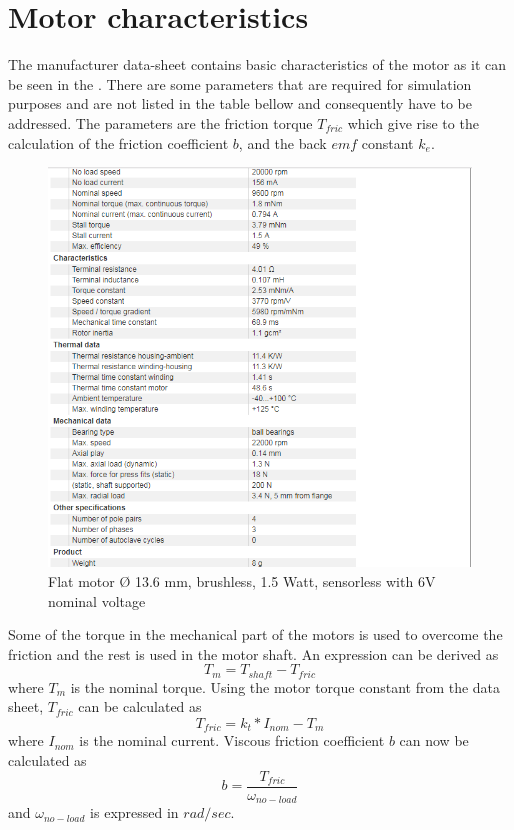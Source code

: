 \chapter{Motor characteristics}\label{chap: motorDatasheet}
%
The manufacturer data-sheet contains basic characteristics of the motor as it can be seen in the . There are some parameters that are required for simulation purposes and are not listed in the table bellow and consequently have to be addressed. The parameters are the friction torque $T_{fric}$ which give rise to the calculation of the friction coefficient $b$, and the back $emf$ constant $k_{e}$.     
%
\begin{figure}[H]
	\centering
	\includegraphics[width=0.7\linewidth]{figures/motorchar}
	\caption{ Flat motor $Ø$ 13.6 mm, brushless, 1.5 Watt, sensorless with 6V nominal voltage}
	\label{fig:323}
\end{figure}
%
%
Some of the torque in the mechanical part of the motors is used to overcome the friction and the rest is used in the motor shaft. An expression can be derived as
 \begin{equation*}
 T_{m} = T_{shaft} - T_{fric}
 \end{equation*}
  where $T_{m}$ is the nominal torque. Using the motor torque constant from the data sheet, $T_{fric}$ can be calculated as 
 \begin{equation*}
 T_{fric}	= k_{t}*I_{nom} - T_{m} 
 \end{equation*}    
where $I_{nom} $ is the nominal current. Viscous friction coefficient $b$ can now be calculated as
\begin{equation*}
	b	= \frac{T_{fric} }{\omega_{no-load}}
\end{equation*}
and $\omega_{no-load}$ is expressed in $rad/sec$.